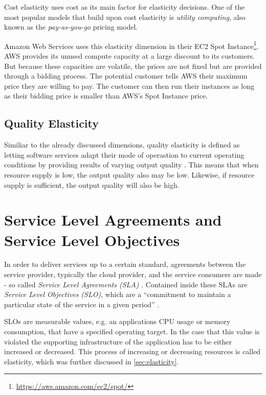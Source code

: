 Cost elasticity uses cost as its main factor for elasticity decisions. One of the most popular models that build upon cost elasticity is \textit{utility computing}, also known as the \textit{pay-as-you-go} pricing model.

Amazon Web Services uses this elasticity dimension in their EC2 Spot Instance\footnote{\url{https://aws.amazon.com/ec2/spot/}}. AWS provides its unused compute capacity at a large discount to its customers. But because these capacities are volatile, the prices are not fixed but are provided through a bidding process. The potential customer tells AWS their maximum price they are willing to pay. The customer can then run their instances as long as their bidding price is smaller than AWS's Spot Instance price.

\subsection{Quality Elasticity}

Similiar to the already discussed dimensions, quality elasticity is defined as letting software services adapt their mode of operastion to current operating conditions by providing results of varying output quality \cite{larssonQualityElasticityImprovedResource2019}. This means that when resource supply is low, the output quality also may be low. Likewise, if resource supply is sufficient, the output quality will also be high.

\section{Service Level Agreements and Service Level Objectives}

In order to deliver services up to a certain standard, agreements between the service provider, typically the cloud provider, and the service consumers are made - so called \textit{Service Level Agreements (SLA)} \cite{emeakarohaLowLevelMetrics2010d}. Contained inside these SLAs are \textit{Service Level Objectives (SLO)}, which are a ``commitment to maintain a particular state of the service in a given period'' \cite{kellerWSLAFrameworkSpecifying2003}.

SLOs are measurable values, e.g. an applications CPU usage or memory consumption, that have a specified operating target. In the case that this value is violated the supporting infrastructure of the application has to be either increased or decreased. This process of increasing or decreasing resources is called elasticity, which was further discussed in \cref{sec:elasticity}.

